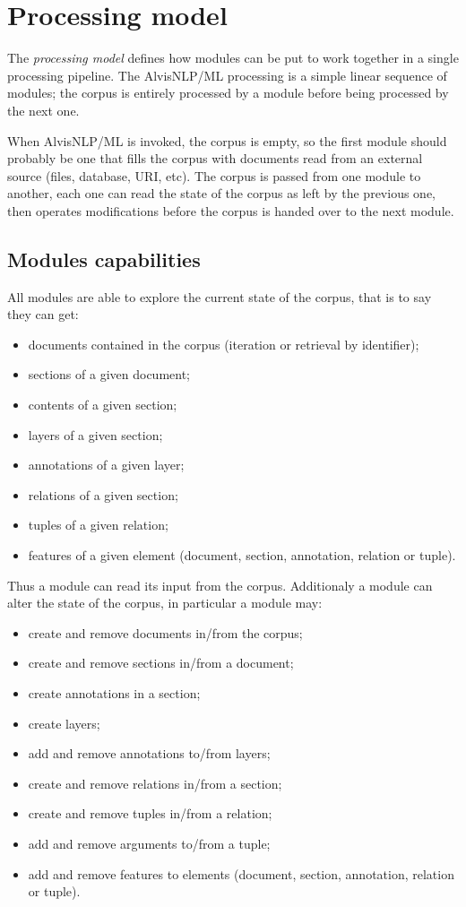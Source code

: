 \documentclass[a4paper]{book}
\begin{document}
\section{Processing model}
The \emph{processing model} defines how modules can be put to work together in a single processing pipeline.
The AlvisNLP/ML processing is a simple linear sequence of modules; the corpus is entirely processed by a module before being processed by the next one.

When AlvisNLP/ML is invoked, the corpus is empty, so the first module should probably be one that fills the corpus with documents read from an external source (files, database, URI, etc).
The corpus is passed from one module to another, each one can read the state of the corpus as left by the previous one, then operates modifications before the corpus is handed over to the next module.

\subsection{Modules capabilities}

All modules are able to explore the current state of the corpus, that is to say they can get: 
\begin{itemize}
\item documents contained in the corpus (iteration or retrieval by identifier);
\item sections of a given document;
\item contents of a given section;
\item layers of a given section;
\item annotations of a given layer;
\item relations of a given section;
\item tuples of a given relation;
\item features of a given element (document, section, annotation, relation or tuple).
\end{itemize}

Thus a module can read its input from the corpus.
Additionaly a module can alter the state of the corpus, in particular a module may:
\begin{itemize}
\item create and remove documents in/from the corpus;
\item create and remove sections in/from a document;
\item create annotations in a section;
\item create layers;
\item add and remove annotations to/from layers;
\item create and remove relations in/from a section;
\item create and remove tuples in/from a relation;
\item add and remove arguments to/from a tuple;
\item add and remove features to elements (document, section, annotation, relation or tuple).
\end{itemize}
\end{document}
